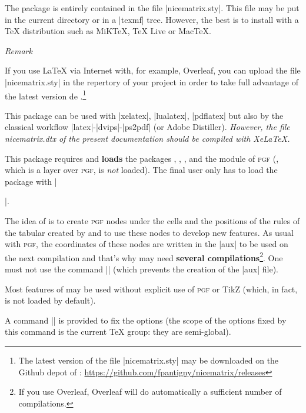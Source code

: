 \documentclass[dvipsnames]{article}%
\begin{document}
\vspace{1cm}
The package  is entirely contained in the file
|nicematrix.sty|. This file may be put in the current directory or in a
|texmf| tree. However, the best is to install  with a TeX
distribution such as MiKTeX, TeX Live or MacTeX.

\medskip
\emph{Remark}\par\nobreak

If you use LaTeX via Internet with, for example, Overleaf, you
can upload the file |nicematrix.sty| in the repertory of your 
project in order to take full advantage of the latest version de
.\footnote{The latest version of the file
|nicematrix.sty| may be downloaded on the Github depot of :\newline
\small
\url{https://github.com/fpantigny/nicematrix/releases}}

\medskip
This package can be used with |xelatex|, |lualatex|, |pdflatex| but also by
the classical workflow |latex|-|dvips|-|ps2pdf| (or Adobe Distiller).
\textsl{However, the file nicematrix.dtx of the present documentation should
be compiled with XeLaTeX.}

\medskip
This package requires and \textbf{loads} the packages ,
, ,  and the module  of
\textsc{pgf} (, which is a layer over \textsc{pgf}, is \emph{not}
loaded). The final user only has to load the package with
|\usepackage{nicematrix}|.


\medskip
The idea of  is to create \textsc{pgf} nodes under the cells
and the positions of the rules of the tabular created by  and to
use these nodes to develop new features. As usual with \textsc{pgf}, the
coordinates of these nodes are written in the |aux| to be used on the next
compilation and that's why  may need \textbf{several
compilations}\footnote{If you use Overleaf, Overleaf will do automatically
a sufficient number of compilations.}. One must not use the command |\nofiles|
(which prevents the creation of the |aux| file).

\medskip
Most features of  may be used without explicit use of
\textsc{pgf} or TikZ (which, in fact, is not loaded by default).

\medskip
{}
A command |\NiceMatrixOptions| is provided to fix the options (the
scope of the options fixed by this command is the current TeX group: they are
semi-global). 
\end{document}
